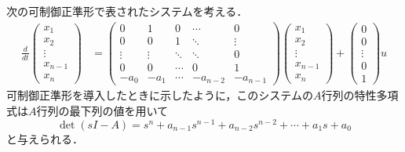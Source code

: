 次の可制御正準形で表されたシステムを考える．
\begin{align}
 \frac{d}{dt}
  \left(\begin{array}{c}
         x_1 \\
	 x_2 \\
	 \vdots \\
	 x_{n-1} \\
	 x_n
	\end{array}\right)
  &=
  \left(\begin{array}{ccccc}
     0      & 1      & 0      & \cdots & 0 \\
	 0      & 0      & 1      & \ddots & \vdots \\
	 \vdots & \vdots & \ddots & \ddots & 0 \\
	 0      & 0      & \cdots & 0      & 1 \\
	 -a_0   & -a_1   & \cdots & -a_{n-2} & -a_{n-1}
	\end{array}\right)
  \left(\begin{array}{c}
	 x_1 \\
	 x_2 \\
	 \vdots \\
	 x_{n-1} \\
	 x_n
	\end{array}\right)
  +
  \left(\begin{array}{c}
         0 \\
	 0 \\
	 \vdots \\
	 0 \\
	 1
	\end{array}\right)
  u 
\end{align}
可制御正準形を導入したときに示したように，このシステムの$A$行列の特性多項式は$A$行列の最下列の値を用いて
\begin{equation}
 \det (sI-{A}) = s^n + a_{n-1} s^{n-1} 
  + a_{n-2} s^{n-2} + \cdots + a_1 s + a_0
\end{equation}
と与えられる．


